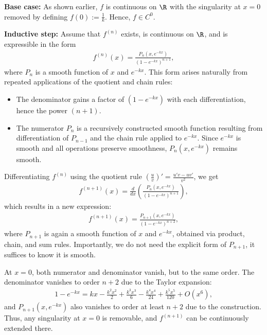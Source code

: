 \begin{Itemize}
    \Item{} \textbf{Base case:} As shown earlier, $f$ is continuous on $\R$ with the singularity at $x = 0$ removed by defining $f(0) := \frac{1}{k}$. Hence, $f \in C^0$.

    \Item{} \textbf{Inductive step:} Assume that $f^{(n)}$ exists, is continuous on $\R$, and is expressible in the form
    \begin{align}
        f^{(n)}(x) = \frac{P_n(x, e^{-kx})}{(1 - e^{-kx})^{n+1}},
    \end{align}
    where $P_n$ is a smooth function of $x$ and $e^{-kx}$. This form arises naturally from repeated applications of the quotient and chain rules:
    
    \begin{itemize}
        \item The denominator gains a factor of $(1 - e^{-kx})$ with each differentiation, hence the power $(n+1)$.
        \item The numerator $P_n$ is a recursively constructed smooth function resulting from differentiation of $P_{n-1}$ and the chain rule applied to $e^{-kx}$. Since $e^{-kx}$ is smooth and all operations preserve smoothness, $P_n(x, e^{-kx})$ remains smooth.
    \end{itemize}
    
    Differentiating $f^{(n)}$ using the quotient rule $\left(\frac{u}{v}\right)' = \frac{u' v - u v'}{v^2}$, we get
    \begin{align}
        f^{(n+1)}(x) = \frac{d}{dx} \left( \frac{P_n(x, e^{-kx})}{(1 - e^{-kx})^{n+1}} \right), 
    \end{align}
    which results in a new expression:
    \begin{align}
        f^{(n+1)}(x) = \frac{P_{n+1}(x, e^{-kx})}{(1 - e^{-kx})^{n+2}},
    \end{align}
    where $P_{n+1}$ is again a smooth function of $x$ and $e^{-kx}$, obtained via product, chain, and sum rules. Importantly, we do not need the explicit form of $P_{n+1}$, it suffices to know it is smooth.

    At $x = 0$, both numerator and denominator vanish, but to the same order. The denominator vanishes to order $n+2$ due to the Taylor expansion:
    \begin{align}
        1 - e^{-kx} = kx - \frac{k^2 x^2}{2} + \frac{k^3 x^3}{6} - \frac{k^4 x^4}{24} + \frac{k^5 x^5}{120} + O(x^6), 
    \end{align}
    and $P_{n+1}(x, e^{-kx})$ also vanishes to order at least $n+2$ due to the construction. Thus, any singularity at $x = 0$ is removable, and $f^{(n+1)}$ can be continuously extended there.
\end{Itemize}

